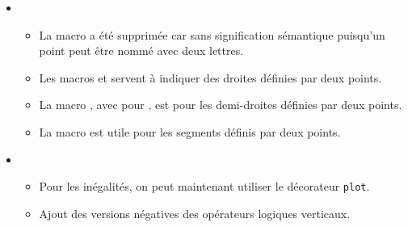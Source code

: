 \documentclass[12pt,a4paper]{article}
\begin{document}
\begin{description}
\begin{itemize}[itemsep=.5em]
\begin{itemize}[itemsep=.5em]
    		\item Les macros ,  et  ont été ajoutées.
    
     		\item {} et  servent à rédiger des dérivées avec des parenthèses extensibles. En coulisse,  et  sont appelées.
    
            Pour utiliser des parenthèses non extensibles, on passera par  et  où  est pour .
    
    		\item Ajout de  pour rendre public l'opérateur intégral proposé par défaut par \LaTeX.
        \end{itemize}
    
    
    
    
        \item {}
        \begin{itemize}[itemsep=.5em]
            \item La macro  a été supprimée car sans signification sémantique puisqu'un point peut être nommé avec deux lettres.
    
            \item Les macros  et  servent à indiquer des droites définies par deux points.
    
            \item La macro , avec  pour , est pour les demi-droites définies par deux points.
    
            \item La macro  est utile pour les segments définis par deux points.
        \end{itemize}
    
    
    
    
        \item {}
        \begin{itemize}[itemsep=.5em]
            \item Pour les inégalités, on peut maintenant utiliser le décorateur \verb+plot+.
    
    		\item Ajout des versions négatives des opérateurs logiques verticaux.
        \end{itemize}
    

\end{itemize}
\end{description}
\end{document}
